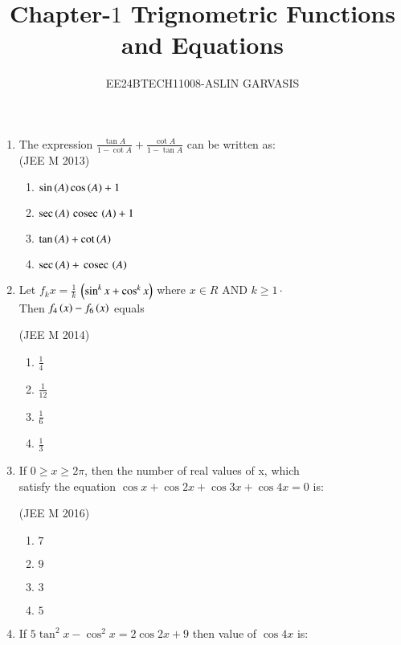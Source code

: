 \documentclass[journal,10pt,twocolumn]{IEEEtran}
\theoremstyle{remark}
\begin{document}

\vspace{3cm}
\title{Chapter-$1$ Trignometric Functions and Equations}
\author{EE24BTECH11008-ASLIN GARVASIS}
\maketitle
\begin{enumerate}[start=14]
\item The expression $\frac{\tan A}{1-\cot A} +\frac{\cot A}{1-\tan A}$ can be written as:\\

\hfill {(JEE M 2013)}\\
    \begin{enumerate}
    \item $\sin\left(A\right)\cos\left(A\right)+1$
    \item $\sec\left(A\right)\,\text{cosec}\,\left(A\right)+1$
    \item $\tan\left(A\right)+\cot\left(A\right)$ 
    \item $\sec\left(A\right)+\,\text{cosec}\,\left(A\right)$
    \end{enumerate}
\item Let $f_{k}x=\frac{1}{k}$ $\left(\sin^{k}x+\cos^{k}x\right)$ where $x\in R$ AND $k\geq 1 \cdot $\\
 Then $f_{4}\left(x\right)-f_{6}\left(x\right)$ equals

\hfill {(JEE M 2014)}\\
    \begin{enumerate}
    \item  $\frac{1}{4}$ 
     \item $\frac{1}{12}$
    \item $\frac{1}{6}$
    \item $\frac{1}{3}$
    \end{enumerate}
\item If $0 \ge x \ge 2\pi$, then the number of real values of x, which \\  satisfy the equation $\cos x+\cos2x+\cos3x+\cos4x=0$ is:

\hfill {(JEE M 2016)}\\
    \begin{enumerate}
    \item $7$
    \item $9$
    \item $3$
    \item $5$
    \end{enumerate}
    
\item If $5${$\tan^2x-\cos^2x=2\cos2x+9$} then value of $\cos 4x$ is:


\end{enumerate}
\end{document}
